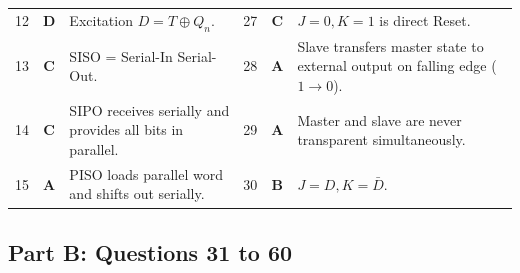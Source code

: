 \begin{table}[htbp]
\begin{tabularx}{\textwidth}{l c X l c X}
12 & \textbf{D} & Excitation $D = T \oplus Q_n$. & 27 & \textbf{C} & $J=0, K=1$ is direct Reset. \\
13 & \textbf{C} & SISO = Serial-In Serial-Out. & 28 & \textbf{A} & Slave transfers master state to external output on falling edge ($1 \to 0$). \\
14 & \textbf{C} & SIPO receives serially and provides all bits in parallel. & 29 & \textbf{A} & Master and slave are never transparent simultaneously. \\
15 & \textbf{A} & PISO loads parallel word and shifts out serially. & 30 & \textbf{B} & $J = D, K = \bar{D}$. \\
\bottomrule
\end{tabularx}
\end{table}

\subsection*{Part B: Questions 31 to 60}
